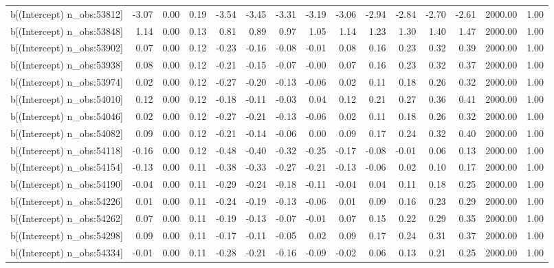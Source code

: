 \begin{table}[ht]
\begin{tabular}{rrrrrrrrrrrrrrr}
  b[(Intercept) n\_obs:53812] & -3.07 & 0.00 & 0.19 & -3.54 & -3.45 & -3.31 & -3.19 & -3.06 & -2.94 & -2.84 & -2.70 & -2.61 & 2000.00 & 1.00 \\ 
  b[(Intercept) n\_obs:53848] & 1.14 & 0.00 & 0.13 & 0.81 & 0.89 & 0.97 & 1.05 & 1.14 & 1.23 & 1.30 & 1.40 & 1.47 & 2000.00 & 1.00 \\ 
  b[(Intercept) n\_obs:53902] & 0.07 & 0.00 & 0.12 & -0.23 & -0.16 & -0.08 & -0.01 & 0.08 & 0.16 & 0.23 & 0.32 & 0.39 & 2000.00 & 1.00 \\ 
  b[(Intercept) n\_obs:53938] & 0.08 & 0.00 & 0.12 & -0.21 & -0.15 & -0.07 & -0.00 & 0.07 & 0.16 & 0.23 & 0.32 & 0.37 & 2000.00 & 1.00 \\ 
  b[(Intercept) n\_obs:53974] & 0.02 & 0.00 & 0.12 & -0.27 & -0.20 & -0.13 & -0.06 & 0.02 & 0.11 & 0.18 & 0.26 & 0.32 & 2000.00 & 1.00 \\ 
  b[(Intercept) n\_obs:54010] & 0.12 & 0.00 & 0.12 & -0.18 & -0.11 & -0.03 & 0.04 & 0.12 & 0.21 & 0.27 & 0.36 & 0.41 & 2000.00 & 1.00 \\ 
  b[(Intercept) n\_obs:54046] & 0.02 & 0.00 & 0.12 & -0.27 & -0.21 & -0.13 & -0.06 & 0.02 & 0.11 & 0.18 & 0.26 & 0.32 & 2000.00 & 1.00 \\ 
  b[(Intercept) n\_obs:54082] & 0.09 & 0.00 & 0.12 & -0.21 & -0.14 & -0.06 & 0.00 & 0.09 & 0.17 & 0.24 & 0.32 & 0.40 & 2000.00 & 1.00 \\ 
  b[(Intercept) n\_obs:54118] & -0.16 & 0.00 & 0.12 & -0.48 & -0.40 & -0.32 & -0.25 & -0.17 & -0.08 & -0.01 & 0.06 & 0.13 & 2000.00 & 1.00 \\ 
  b[(Intercept) n\_obs:54154] & -0.13 & 0.00 & 0.11 & -0.38 & -0.33 & -0.27 & -0.21 & -0.13 & -0.06 & 0.02 & 0.10 & 0.17 & 2000.00 & 1.00 \\ 
  b[(Intercept) n\_obs:54190] & -0.04 & 0.00 & 0.11 & -0.29 & -0.24 & -0.18 & -0.11 & -0.04 & 0.04 & 0.11 & 0.18 & 0.25 & 2000.00 & 1.00 \\ 
  b[(Intercept) n\_obs:54226] & 0.01 & 0.00 & 0.11 & -0.24 & -0.19 & -0.13 & -0.06 & 0.01 & 0.09 & 0.16 & 0.23 & 0.29 & 2000.00 & 1.00 \\ 
  b[(Intercept) n\_obs:54262] & 0.07 & 0.00 & 0.11 & -0.19 & -0.13 & -0.07 & -0.01 & 0.07 & 0.15 & 0.22 & 0.29 & 0.35 & 2000.00 & 1.00 \\ 
  b[(Intercept) n\_obs:54298] & 0.09 & 0.00 & 0.11 & -0.17 & -0.11 & -0.05 & 0.02 & 0.09 & 0.17 & 0.24 & 0.31 & 0.37 & 2000.00 & 1.00 \\ 
  b[(Intercept) n\_obs:54334] & -0.01 & 0.00 & 0.11 & -0.28 & -0.21 & -0.16 & -0.09 & -0.02 & 0.06 & 0.13 & 0.21 & 0.25 & 2000.00 & 1.00 \\ 

\end{tabular}
\end{table}
